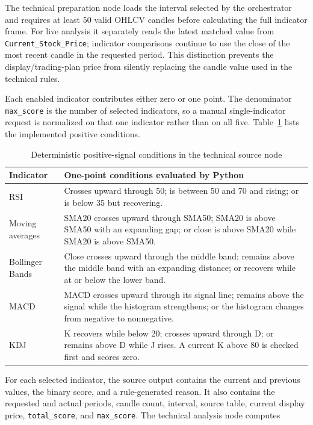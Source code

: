 The technical preparation node loads the interval selected by the orchestrator and requires at least 50 valid OHLCV candles before calculating the full indicator frame. For live analysis it separately reads the latest matched value from \texttt{Current\_Stock\_Price}; indicator comparisons continue to use the close of the most recent candle in the requested period. This distinction prevents the display/trading-plan price from silently replacing the candle value used in the technical rules.

Each enabled indicator contributes either zero or one point. The denominator \texttt{max\_score} is the number of selected indicators, so a manual single-indicator request is normalized on that one indicator rather than on all five. Table~\ref{tab:technical-signal-scoring} lists the implemented positive conditions.

\begin{table}[H]
    \centering
    \caption{Deterministic positive-signal conditions in the technical source node}
    \label{tab:technical-signal-scoring}
    \footnotesize
    \setlength{\tabcolsep}{4pt}
    \renewcommand{\arraystretch}{1.18}
    \begin{tabular}{p{1.65cm} p{10.9cm}}
        \toprule
        \textbf{Indicator} & \textbf{One-point conditions evaluated by Python} \\
        \midrule
        RSI & Crosses upward through 50; is between 50 and 70 and rising; or is below 35 but recovering. \\
        Moving averages & SMA20 crosses upward through SMA50; SMA20 is above SMA50 with an expanding gap; or close is above SMA20 while SMA20 is above SMA50. \\
        Bollinger Bands & Close crosses upward through the middle band; remains above the middle band with an expanding distance; or recovers while at or below the lower band. \\
        MACD & MACD crosses upward through its signal line; remains above the signal while the histogram strengthens; or the histogram changes from negative to nonnegative. \\
        KDJ & K recovers while below 20; crosses upward through D; or remains above D while J rises. A current K above 80 is checked first and scores zero. \\
        \bottomrule
    \end{tabular}
\end{table}

For each selected indicator, the source output contains the current and previous values, the binary score, and a rule-generated reason. It also contains the requested and actual periods, candle count, interval, source table, current display price, \texttt{total\_score}, and \texttt{max\_score}. The technical analysis node computes

